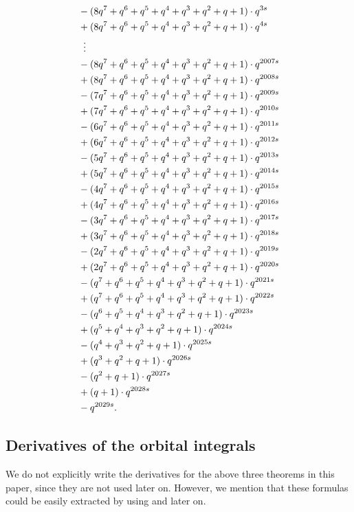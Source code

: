 \begin{example}
\begin{align*}
    &- (8q^7+q^6+q^5+q^4+q^3+q^2+q+1) \cdot q^{3s} \\
    &+ (8q^7+q^6+q^5+q^4+q^3+q^2+q+1) \cdot q^{4s} \\
    &\vdotswithin= \\
    &- (8q^7+q^6+q^5+q^4+q^3+q^2+q+1) \cdot q^{2007s} \\
    &+ (8q^7+q^6+q^5+q^4+q^3+q^2+q+1) \cdot q^{2008s} \\
    &- (7q^7+q^6+q^5+q^4+q^3+q^2+q+1) \cdot q^{2009s} \\
    &+ (7q^7+q^6+q^5+q^4+q^3+q^2+q+1) \cdot q^{2010s} \\
    &- (6q^7+q^6+q^5+q^4+q^3+q^2+q+1) \cdot q^{2011s} \\
    &+ (6q^7+q^6+q^5+q^4+q^3+q^2+q+1) \cdot q^{2012s} \\
    &- (5q^7+q^6+q^5+q^4+q^3+q^2+q+1) \cdot q^{2013s} \\
    &+ (5q^7+q^6+q^5+q^4+q^3+q^2+q+1) \cdot q^{2014s} \\
    &- (4q^7+q^6+q^5+q^4+q^3+q^2+q+1) \cdot q^{2015s} \\
    &+ (4q^7+q^6+q^5+q^4+q^3+q^2+q+1) \cdot q^{2016s} \\
    &- (3q^7+q^6+q^5+q^4+q^3+q^2+q+1) \cdot q^{2017s} \\
    &+ (3q^7+q^6+q^5+q^4+q^3+q^2+q+1) \cdot q^{2018s} \\
    &- (2q^7+q^6+q^5+q^4+q^3+q^2+q+1) \cdot q^{2019s} \\
    &+ (2q^7+q^6+q^5+q^4+q^3+q^2+q+1) \cdot q^{2020s} \\
    &- (q^7+q^6+q^5+q^4+q^3+q^2+q+1) \cdot q^{2021s} \\
    &+ (q^7+q^6+q^5+q^4+q^3+q^2+q+1) \cdot q^{2022s} \\
    &- (q^6+q^5+q^4+q^3+q^2+q+1) \cdot q^{2023s} \\
    &+ (q^5+q^4+q^3+q^2+q+1) \cdot q^{2024s} \\
    &- (q^4+q^3+q^2+q+1) \cdot q^{2025s} \\
    &+ (q^3+q^2+q+1) \cdot q^{2026s} \\
    &- (q^2+q+1) \cdot q^{2027s} \\
    &+ (q+1) \cdot q^{2028s} \\
    &- q^{2029s}.
  \end{align*}
\end{example}
\subsection{Derivatives of the orbital integrals}
We do not explicitly write the derivatives for the above three theorems in this paper,
since they are not used later on.
However, we mention that these formulas could be easily extracted by using
 and  later on.
